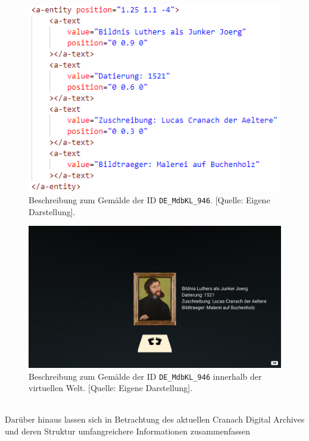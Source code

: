 \documentclass[a4paper,12pt,oneside]{article}
\begin{document}
        \begin{figure}
          \centering
          \includegraphics{img/coding/description2.png}
          \caption[Beschreibung zum Gemälde der ID \texttt{DE\_MdbKL\_946}.]{Beschreibung zum Gemälde der ID \texttt{DE\_MdbKL\_946}. [Quelle: Eigene Darstellung].}
          \label{fig:description2}
        \end{figure}        
        \begin{figure}
          \centering
          \includegraphics[scale=0.3]{img/coding/description1.png}
          \caption[Beschreibung zum Gemälde der ID \texttt{DE\_MdbKL\_946} innerhalb der virtuellen Welt.]{Beschreibung zum Gemälde der ID \texttt{DE\_MdbKL\_946} innerhalb der virtuellen Welt. [Quelle: Eigene Darstellung].}
          \label{fig:description1}
        \end{figure} \\
        Darüber hinaus lassen sich in Betrachtung des aktuellen 
        Cranach Digital Archives und deren Struktur
        umfangreichere Informationen zusammenfassen 
\end{document}
